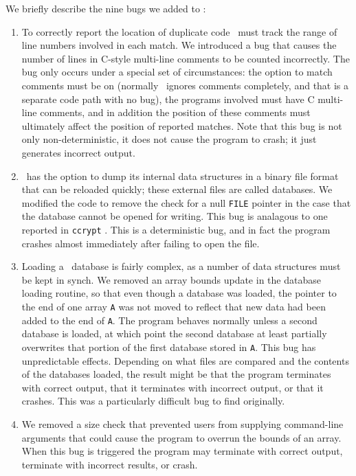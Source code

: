 We briefly describe the nine bugs we added to \moss:
\begin{enumerate}
\item To correctly report the location of duplicate code \moss\ must
track the range of line numbers involved in each match.  We
introduced a bug that causes the number of lines in C-style multi-line
comments to be counted incorrectly.  The bug only occurs under a
special set of circumstances: the option to match comments must be on
(normally \moss\ ignores comments completely, and that is a separate
code path with no bug), the programs involved must have C multi-line
comments, and in addition the position of these comments must
ultimately affect the position of reported matches.  Note that this
bug is not only non-deterministic, it does not cause the program to
crash; it just generates incorrect output.

\item \moss\ has the option to dump its internal data structures in a
binary file format that can be reloaded quickly; these external files
are called databases.  We modified the code to remove the check for a
null {\tt FILE} pointer in the case that the database cannot be opened
for writing.  This bug is analagous to one reported in {\tt ccrypt}
\cite{ccrypt-reference}.  This is a deterministic bug, and in fact the
program crashes almost immediately after failing to open the file.

\item Loading a \moss\ database is fairly complex, as a number of data
structures must be kept in synch.  We removed an array bounds update
in the database loading routine, so that even though a database was
loaded, the pointer to the end of one array {\tt A} was not moved to
reflect that new data had been added to the end of {\tt A}. The
program behaves normally unless a second database is loaded, at which
point the second database at least partially overwrites that portion
of the first database stored in {\tt A}.  This bug has unpredictable
effects.  Depending on what files are compared and the contents of the
databases loaded, the result might be that the program terminates with
correct output, that it terminates with incorrect output, or that it
crashes.  This was a particularly difficult bug to find originally.

\item We removed a size check that prevented users from supplying command-line arguments
that could cause the program to overrun the bounds of an array.  When
this bug is triggered the program may terminate with correct output,
terminate with incorrect results, or crash.



\end{enumerate}
